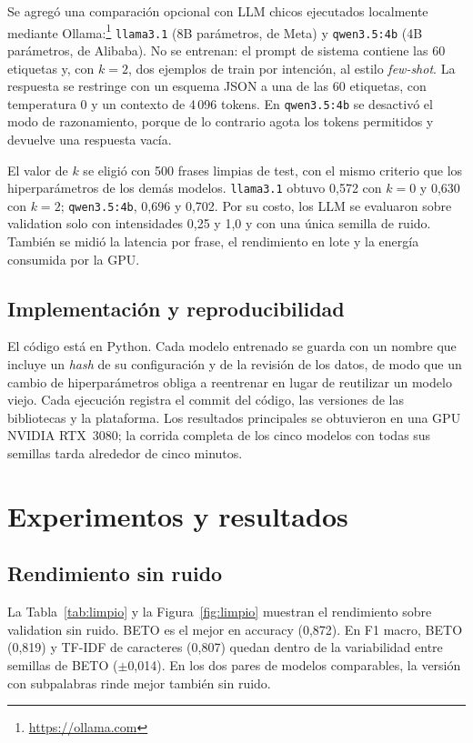 \documentclass[11pt,a4paper]{article}
\newcommand{\cod}[1]{\texttt{#1}}
\begin{document}
Se agregó una comparación opcional con LLM chicos
ejecutados localmente mediante Ollama:\footnote{\url{https://ollama.com}} \cod{llama3.1} (8B
parámetros, de Meta) y \cod{qwen3.5:4b} (4B parámetros, de Alibaba). No se entrenan: el prompt
de sistema contiene las 60 etiquetas y, con $k=2$, dos ejemplos de train por intención, al
estilo \emph{few-shot}. La respuesta se restringe con un esquema JSON a una de las 60 etiquetas,
con temperatura 0 y un contexto de 4\,096 tokens. En \cod{qwen3.5:4b} se desactivó el modo de
razonamiento, porque de lo contrario agota los tokens permitidos y devuelve una respuesta
vacía.

El valor de $k$ se eligió con 500 frases limpias de test, con el mismo criterio que los
hiperparámetros de los demás modelos. \cod{llama3.1} obtuvo 0,572 con $k=0$ y 0,630 con $k=2$;
\cod{qwen3.5:4b}, 0,696 y 0,702. Por su costo, los LLM se evaluaron sobre validation solo con
intensidades 0,25 y 1,0 y con una única semilla de ruido. También se midió la latencia por
frase, el rendimiento en lote y la energía consumida por la GPU.

\subsection{Implementación y reproducibilidad}

El código está en Python. Cada modelo entrenado se guarda con un nombre que incluye un
\emph{hash} de su configuración y de la revisión de los datos, de modo que un cambio de
hiperparámetros obliga a reentrenar en lugar de reutilizar un modelo viejo. Cada ejecución
registra el commit del código, las versiones de las bibliotecas y la plataforma. Los
resultados principales se obtuvieron en una GPU NVIDIA RTX~3080; la corrida completa de los
cinco modelos con todas sus semillas tarda alrededor de cinco minutos.

\section{Experimentos y resultados}

\subsection{Rendimiento sin ruido}

La Tabla~\ref{tab:limpio} y la Figura~\ref{fig:limpio} muestran el rendimiento sobre
validation sin ruido. BETO es el mejor en accuracy (0,872). En F1 macro, BETO (0,819) y TF-IDF
de caracteres (0,807) quedan dentro de la variabilidad entre semillas de BETO ($\pm$0,014).
En los dos pares de modelos comparables, la versión con subpalabras rinde mejor también sin
ruido.
\end{document}
